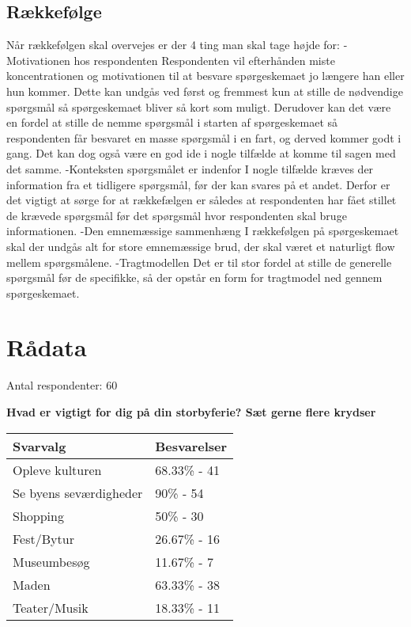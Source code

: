 \subsection{Rækkefølge}
Når rækkefølgen skal overvejes er der 4 ting man skal tage højde for: 
-Motivationen hos respondenten
Respondenten vil efterhånden miste koncentrationen og motivationen til at besvare spørgeskemaet jo længere han eller hun kommer. Dette kan undgås ved først og fremmest kun at stille de nødvendige spørgsmål så spørgeskemaet bliver så kort som muligt. Derudover kan det være en fordel at stille de nemme spørgsmål i starten af spørgeskemaet så respondenten får besvaret en masse spørgsmål i en fart, og derved kommer godt i gang. Det kan dog også være en god ide i nogle tilfælde at komme til sagen med det samme.
-Konteksten spørgsmålet er indenfor 
I nogle tilfælde kræves der information fra et tidligere spørgsmål, før der kan svares på et andet. Derfor er det vigtigt at sørge for at rækkefælgen er således at respondenten har fået stillet de krævede spørgsmål før det spørgsmål hvor respondenten skal bruge informationen.
-Den emnemæssige sammenhæng 
I rækkefølgen på spørgeskemaet skal der undgås alt for store emnemæssige brud, der skal været et naturligt flow mellem spørgsmålene.
-Tragtmodellen
Det er til stor fordel at stille de generelle spørgsmål før de specifikke, så der opstår en form for tragtmodel ned gennem spørgeskemaet.


\section{Rådata}
Antal respondenter: 60

\textbf{Hvad er vigtigt for dig på din storbyferie?
Sæt gerne flere krydser}

    \begin{tabular}{| l | l |}
    \hline
    Svarvalg & Besvarelser \\ \hline
    Opleve kulturen & 68.33\% - 41 \\ \hline
    Se byens seværdigheder & 90\% - 54 \\ \hline
    Shopping & 50\% - 30 \\ \hline
    Fest/Bytur & 26.67\% - 16 \\ \hline
    Museumbesøg & 11.67\% - 7 \\ \hline
    Maden & 63.33\% - 38 \\ \hline
    Teater/Musik & 18.33\% - 11 \\
    \hline
    \end{tabular}
\newline

